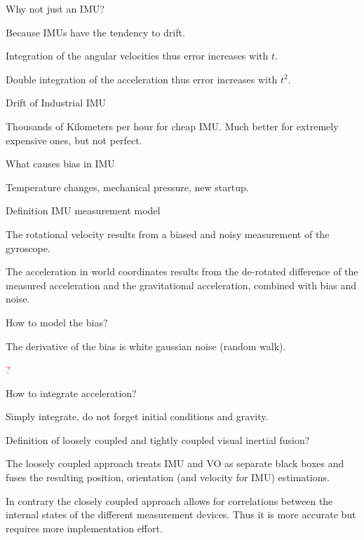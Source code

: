 \documentclass[10pt,a4paper]{scrartcl}
\begin{document}
\begin{multicols*}{2}
\begin{QandA}{Why not just an IMU?}
\item Because IMUs have the tendency to drift.
\item Integration of the angular velocities thus error increases with $t$.
\item Double integration of the acceleration thus error increases with $t^2$.
\end{QandA}

\begin{QandA}
{Drift of Industrial IMU}
\item Thousands of Kilometers per hour for cheap IMU. Much better for extremely expensive ones, but not perfect.
\end{QandA}

\begin{QandA}
{What causes bias in IMU}
\item Temperature changes, mechanical pressure, new startup.
\end{QandA}

\begin{QandA}
{Definition IMU measurement model}
\item The rotational velocity results from a biased and noisy measurement of the gyroscope.
\item The acceleration in world coordinates results from the de-rotated difference of the measured acceleration and the gravitational acceleration, combined with bias and noise.
\end{QandA}

\begin{QandA}
{How to model the bias?}
\item The derivative of the bias is white gaussian noise (random walk).
\item \textcolor{red}{?}
\end{QandA}

\begin{QandA}
{How to integrate acceleration?}
\item Simply integrate, do not forget initial conditions and gravity.
\end{QandA}

\begin{QandA}
{Definition of loosely coupled and tightly coupled visual inertial fusion?}
\item The loosely coupled approach treats IMU and VO as separate black boxes and fuses the resulting position, orientation (and velocity for IMU) estimations.
\item In contrary the closely coupled approach allows for correlations between the internal states of the different measurement devices. Thus it is more accurate but requires more implementation effort.
\end{QandA}


\end{multicols*}
\end{document}
